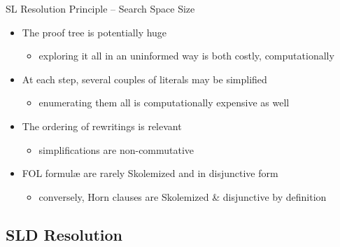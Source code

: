 \documentclass[presentation]{beamer}\mode<presentation>{\usetheme{AMSBolognaFC}}
\begin{document}
\begin{frame}{SL Resolution Principle -- Search Space Size}
    \begin{itemize}
        \item The proof tree is potentially \alert{huge}
        \begin{itemize}
            \item exploring it all in an \alert{uninformed} way is both costly, computationally
        \end{itemize}

        \vfill

        \item At each step, several couples of literals may be simplified
        \begin{itemize}
            \item enumerating them all is computationally expensive as well
        \end{itemize}

        \vfill

        \item The ordering of rewritings is \alert{relevant}
        \begin{itemize}
            \item simplifications are \alert{non-commutative}
        \end{itemize}

        \vfill

        \item FOL formul\ae{} are \alert{rarely} Skolemized and in \alert{disjunctive} form
        \begin{itemize}
            \item conversely, Horn clauses are Skolemized \& disjunctive \alert{by definition}
        \end{itemize}
    \end{itemize}
\end{frame}

\subsection{SLD Resolution}
\end{document}
